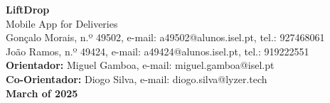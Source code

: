 \documentclass[a4paper,twoside,11pt]{article}
\begin{document}
\vspace{-15mm}
\begin{figure}[h]
\begin{center}
\end{center}
\end{figure}
\vspace{-8mm}

\begin{center}
    \LARGE \textbf{LiftDrop} \\ %
    \LARGE Mobile App for Deliveries \\ %
    \vspace{8mm}
    \large Gonçalo Morais, n.º 49502, e-mail: a49502@alunos.isel.pt, tel.: 927468061 \\
    \vspace{1mm}
    \large João Ramos, n.º 49424, e-mail: a49424@alunos.isel.pt, tel.: 919222551 \\
    \vspace{5mm}
    \large \textbf{Orientador:} Miguel Gamboa, e-mail: miguel.gamboa@isel.pt \\
    \vspace{3mm}
    \large \textbf{Co-Orientador:} Diogo Silva, e-mail: diogo.silva@lyzer.tech \\
    \vspace{5mm}
    \textbf{March of 2025}
\end{center}

\vspace{10mm}

\newpage
\end{document}
